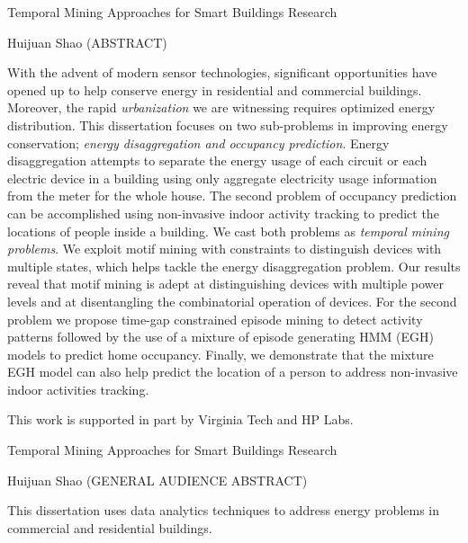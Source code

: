 \documentclass[12pt,pdf]{report}
\begin{document}
\pagebreak
\thispagestyle{empty}
\begin{center}

{\large Temporal Mining Approaches for Smart Buildings Research }

\vfill
Huijuan Shao
\vfill
(ABSTRACT)
\vfill
\end{center}
With the advent of modern sensor technologies, 
significant opportunities have opened up to help conserve energy in 
residential and commercial buildings. Moreover, the rapid \emph{urbanization} we are witnessing requires optimized energy distribution. 
This dissertation focuses on two sub-problems in improving energy conservation; \emph{energy disaggregation and occupancy prediction}. 
Energy disaggregation attempts to 
separate the energy usage 
of each circuit or each electric device in a building 
using only aggregate electricity usage information from 
the meter for the whole house. 
The second problem of occupancy prediction can be accomplished using non-invasive indoor activity tracking to 
predict the locations of people inside a building. 
We cast both problems as \emph{temporal mining problems}. We exploit motif mining with constraints to distinguish devices with multiple states, which helps tackle the energy disaggregation problem. Our
results reveal that motif mining is adept at distinguishing
devices with multiple power levels and at disentangling the
combinatorial operation of devices.
For the second problem we propose time-gap constrained episode mining to detect 
activity patterns followed by the use of a mixture of episode generating HMM (EGH) models 
to predict home occupancy.  
Finally, we demonstrate that the mixture EGH
model can also help predict the location of a person to 
address non-invasive indoor activities tracking. 

\vfill


This work is supported in part by Virginia Tech and HP Labs. 

\pagebreak

\thispagestyle{empty}
\begin{center}

{\large Temporal Mining Approaches for Smart Buildings Research }

\vfill
Huijuan Shao
\vfill
(GENERAL AUDIENCE ABSTRACT)
\vfill
\end{center}
This dissertation uses data analytics techniques to address energy problems in commercial and residential buildings. 
\end{document}
